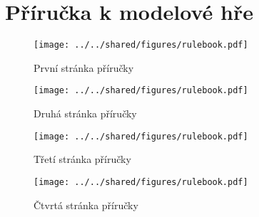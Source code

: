 \chapter{Příručka k modelové hře}
\label{chap:rulebook}

\begin{figure}[h]
    \centering
    \texttt{[image: ../../shared/figures/rulebook.pdf]}
    \caption{První stránka příručky}
    \label{fig:rulebook1}
\end{figure}

\begin{figure}[h]
    \centering
    \texttt{[image: ../../shared/figures/rulebook.pdf]}
    \caption{Druhá stránka příručky}
    \label{fig:rulebook2}
\end{figure}

\begin{figure}[h]
    \centering
    \texttt{[image: ../../shared/figures/rulebook.pdf]}
    \caption{Třetí stránka příručky}
    \label{fig:rulebook3}
\end{figure}

\begin{figure}[h]
    \centering
    \texttt{[image: ../../shared/figures/rulebook.pdf]}
    \caption{Čtvrtá stránka příručky}
    \label{fig:rulebook4}
\end{figure}